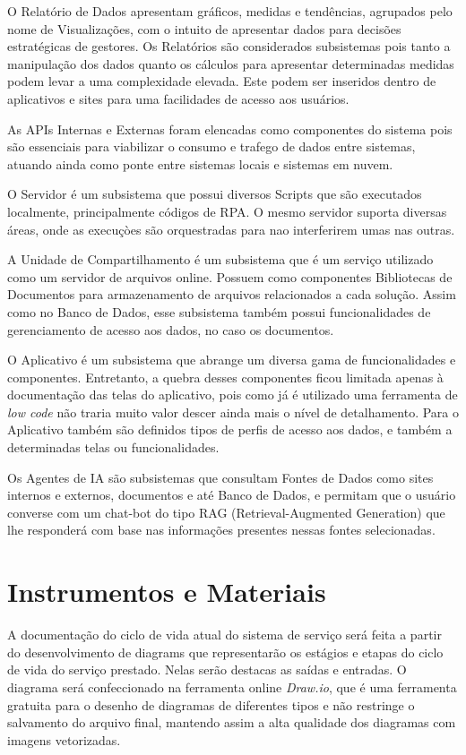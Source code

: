 	O Relatório de Dados apresentam gráficos, medidas e tendências, agrupados pelo nome de Visualizações, com o intuito de apresentar dados para decisões estratégicas de gestores. Os Relatórios
	são considerados subsistemas pois tanto	a manipulação dos dados quanto os cálculos para apresentar determinadas medidas podem levar a uma complexidade elevada. Este podem ser inseridos dentro
	de aplicativos e sites para uma facilidades de acesso aos usuários.

	As APIs Internas e Externas foram elencadas como componentes do sistema pois são essenciais para viabilizar o consumo e trafego de dados entre sistemas, atuando ainda como ponte entre sistemas
	locais e sistemas em nuvem.

	O Servidor é um subsistema que possui diversos Scripts que são executados localmente, principalmente códigos de RPA. O mesmo servidor suporta diversas áreas, onde as execuçòes são orquestradas
	para nao interferirem umas nas outras.

	A Unidade de Compartilhamento é um subsistema que é um serviço utilizado como um servidor de arquivos online. Possuem como componentes Bibliotecas de Documentos para armazenamento de arquivos relacionados
	a cada solução. Assim como no Banco de Dados, esse subsistema também possui funcionalidades de gerenciamento de acesso aos dados, no caso os documentos.

	O Aplicativo é um subsistema que abrange um diversa gama de funcionalidades e componentes. Entretanto, a quebra desses componentes ficou limitada apenas à documentação das telas do aplicativo,
	pois como já é utilizado uma ferramenta de \textit{low code} não traria muito valor descer ainda mais o nível de detalhamento. Para o Aplicativo também são definidos tipos de perfis de acesso
	aos dados, e também a determinadas telas ou funcionalidades.

	Os Agentes de IA são subsistemas que consultam Fontes de Dados como sites internos e externos, documentos e até Banco de Dados, e permitam que o usuário converse com um chat-bot do tipo RAG
	(Retrieval-Augmented Generation) que lhe responderá com base nas informações presentes nessas fontes selecionadas.



	\section{Instrumentos e Materiais}

	A documentação do ciclo de vida atual do sistema de serviço será feita a partir do desenvolvimento de diagrams que representarão os estágios e etapas do ciclo de vida do serviço prestado. Nelas serão destacas as saídas e entradas. O diagrama será confeccionado na ferramenta online \textit{Draw.io}, 
	que é uma ferramenta gratuita para o desenho de diagramas de diferentes 
	tipos e não restringe o salvamento do arquivo final, mantendo 
	assim a alta qualidade dos diagramas com imagens vetorizadas. 
	
